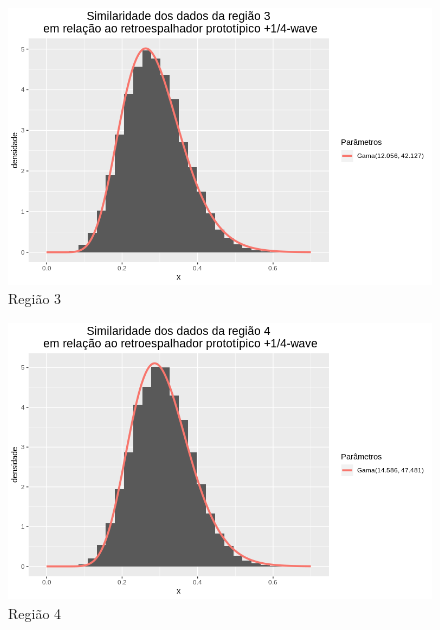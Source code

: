 \documentclass[12pt]{article}
\begin{document}
\begin{figure}[!h]
    \centering
    \vspace{0.1\linewidth}
    \includegraphics[width = \linewidth]{../../Images/Report_18_12_20/pwv_region3.png}
    \caption{Região 3}
    \label{fig:pwv_r3}
\end{figure}

\begin{figure}[!h]
    \centering
    \vspace{0.1\linewidth}
    \includegraphics[width = \linewidth]{../../Images/Report_18_12_20/pwv_region4.png}
    \caption{Região 4}
    \label{fig:pwv_r4}
\end{figure}
\end{document}
